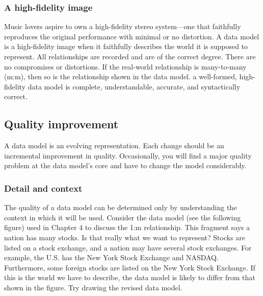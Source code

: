 \documentclass[
]{article}
\begin{document}
\hypertarget{a-high-fidelity-image}{%
\subsubsection*{A high-fidelity image}\label{a-high-fidelity-image}}

Music lovers aspire to own a high-fidelity stereo system---one that
faithfully reproduces the original performance with minimal or no
distortion. A data model is a high-fidelity image when it faithfully
describes the world it is supposed to represent. All relationships are
recorded and are of the correct degree. There are no compromises or
distortions. If the real-world relationship is many-to-many (m:m), then
so is the relationship shown in the data model. a well-formed,
high-fidelity data model is complete, understandable, accurate, and
syntactically correct.

\hypertarget{quality-improvement}{%
\subsection*{Quality improvement}\label{quality-improvement}}

A data model is an evolving representation. Each change should be an
incremental improvement in quality. Occasionally, you will find a major
quality problem at the data model's core and have to change the model
considerably.

\hypertarget{detail-and-context}{%
\subsubsection*{Detail and context}\label{detail-and-context}}

The quality of a data model can be determined only by understanding the
context in which it will be used. Consider the data model (see the
following figure) used in Chapter 4 to discuss the 1:m relationship.
This fragment says a nation has many stocks. Is that really what we want
to represent? Stocks are listed on a stock exchange, and a nation may
have several stock exchanges. For example, the U.S. has the New York
Stock Exchange and NASDAQ. Furthermore, some foreign stocks are listed
on the New York Stock Exchange. If this is the world we have to
describe, the data model is likely to differ from that shown in the
figure. Try drawing the revised data model.
\end{document}
